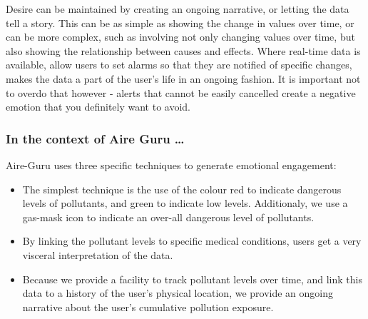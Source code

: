 Desire can be maintained by creating an ongoing narrative, or letting the data tell a story. This can be as simple as showing the change in 
values over time, or can be more complex, such as involving not only changing values over time, but also showing the relationship between causes and
effects. Where real-time data is available, allow users to set alarms so that they are notified of specific changes, makes the data a part of the user's
life in an ongoing fashion. It is important not to overdo that however - alerts that cannot be easily cancelled create a negative emotion that you
definitely want to avoid. \\

\subsubsection*{In the context of Aire Guru \ldots}

Aire-Guru uses three specific techniques to generate emotional engagement:

\begin{itemize}

    \item The simplest technique is the use of the colour red to indicate dangerous levels of pollutants, and green to indicate low levels.
    Additionaly, we use a gas-mask icon to indicate an over-all dangerous level of pollutants.

    \item By linking the pollutant levels to specific medical conditions, users get a very visceral interpretation of the data.
    
    \item Because we provide a facility to track pollutant levels over time, and link this data to a history of the user's physical location, we provide
    an ongoing narrative about the user's cumulative pollution exposure.

\end{itemize}
